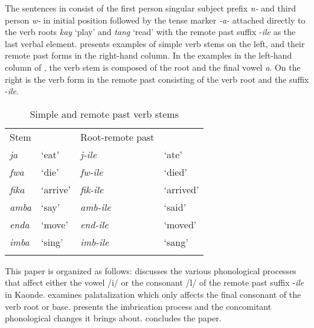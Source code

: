 \documentclass[output=paper]{langsci/langscibook}
\begin{document}
\ea
\label{ex:1.kawasha}
	\z

	\z
\z 



The sentences in  consist of the first person singular subject prefix \textit{n-} and third person \textit{w-} in initial position followed by the tense marker \textit{-a-} attached directly to the verb roots \textit{kay} ‘play’ and \textit{tang} ‘read’ with the remote past suffix -\textit{ile} as the last verbal element.  presents examples of simple verb stems on the left, and their remote past forms in the right-hand column. In the examples in the left-hand column of , the verb stem is composed of the root and the final vowel \textit{a}. On the right is the verb form in the remote past consisting of the verb root and the suffix -\textit{ile}.


\begin{table}
\begin{tabular}{llll}
\lsptoprule
  Stem &  &   Root-remote past & \\
\textit{ja } & `eat' & \textit{j-ile} & `ate' \\
\textit{fwa} & `die' & \textit{fw-ile} & `died' \\
\textit{fika} & `arrive' & \textit{fik-ile} & `arrived' \\
\textit{amba} & `say' & \textit{amb-ile} & `said' \\
\textit{enda} & `move' & \textit{end-ile} & `moved' \\
\textit{imba} & `sing' & \textit{imb-ile} & `sang' \\

\lspbottomrule
\end{tabular}

\caption{Simple and remote past verb stems}
\label{tab:1.kawasha}

 \end{table}


This paper is organized as follows:  discusses the various phonological processes that affect either the vowel /i/ or the consonant /l/ of the remote past suffix -\textit{ile} in Kaonde.  examines palatalization which only affects the final consonant of the verb root or base.  presents the imbrication process and the concomitant phonological changes it brings about.  concludes the paper.
\end{document}
